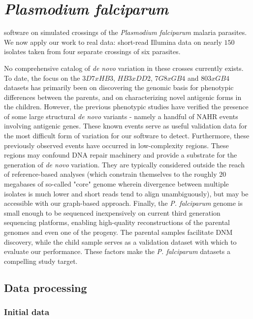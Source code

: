 \chapter{\textit{Plasmodium falciparum}}
\label{ch:pf}

 software on simulated crossings of the \textit{Plasmodium falciparum} malaria parasites.  We now apply our work to real data: short-read Illumina data on nearly $150$ isolates taken from four separate crossings of six parasites.

No comprehensive catalog of \textit{de novo} variation in these crosses currently exists.  To date, the focus on the $3D7xHB3$, $HB3xDD2$, $7G8xGB4$ and $803xGB4$ datasets has primarily been on discovering the genomic basis for phenotypic differences between the parents, and on characterizing novel antigenic forms in the children.  However, the previous phenotypic studies have verified the presence of some large structural \textit{de novo} variants - namely a handful of NAHR events involving antigenic genes.  These known events serve as useful validation data for the most difficult form of variation for our software to detect.  Furthermore, these previously observed events have occurred in low-complexity regions.  These regions may confound DNA repair machinery and provide a substrate for the generation of \textit{de novo} variation.  They are typically considered outside the reach of reference-based analyses (which constrain themselves to the roughly $20$ megabases of so-called "core" genome wherein divergence between multiple isolates is much lower and short reads tend to align unambiguously\cite{Miles:2015in}), but may be accessible with our graph-based approach.  Finally, the \textit{P. falciparum} genome is small enough to be sequenced inexpensively on current third generation sequencing platforms, enabling high-quality reconstructions of the parental genomes and even one of the progeny.  The parental samples facilitate DNM discovery, while the child sample serves as a validation dataset with which to evaluate our performance.  These factors make the \textit{P. falciparum} datasets a compelling study target.

\section{Data processing}

\subsection{Initial data}

